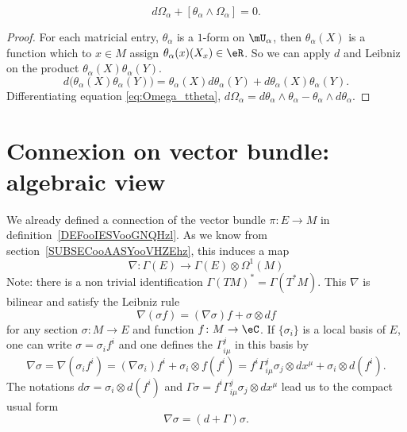 \begin{lemma}
	\[
		d\Omega_{\alpha}+[\theta_{\alpha}\wedge\Omega_{\alpha}]=0.
	\]
\end{lemma}

\begin{proof}
	For each matricial entry, $\theta_{\alpha}$ is a $1$-form on $\mU_{\alpha}$, then $\theta_{\alpha}(X)$ is a function which to $x\in M$ assign $\theta_{\alpha}(x)(X_x)\in\eR$. So we can apply $d$ and Leibniz on the product $\theta_{\alpha}(X)\theta_{\alpha}(Y)$.
	\[
		d\big(  \theta_{\alpha}(X)\theta_{\alpha}(Y)  \big)=\theta_{\alpha}(X)d\theta_{\alpha}(Y)+d\theta_{\alpha}(X)\theta_{\alpha}(Y).
	\]
	Differentiating equation \eqref{eq:Omega_ttheta}, $d\Omega_{\alpha}=d\theta_{\alpha}\wedge\theta_{\alpha}-\theta_{\alpha}\wedge d\theta_{\alpha}$.
\end{proof}

\section{Connexion on vector bundle: algebraic view}

We already defined a connection of the vector bundle \( \pi\colon E\to M\) in definition~\ref{DEFooIESVooGNQHzl}. As we know from section~\ref{SUBSECooAASYooVHZEhz}, this induces a map
\begin{equation}        \label{EQooBRLHooJgzIyT}
	\nabla\colon \Gamma(E)\to \Gamma(E)\otimes \Omega^1(M)
\end{equation}
Note: there is a non trivial identification \( \Gamma(TM)^*=\Gamma(T^*M)\). This \( \nabla\) is bilinear and satisfy the Leibniz rule
\begin{equation}
	\nabla(\sigma f)=(\nabla\sigma)f+\sigma\otimes df
\end{equation}
for any section $\sigma\colon M\to E$ and function $f\colon M\to \eC$. If $\{ \sigma_i \}$ is a local basis of $E$, one can write $\sigma=\sigma_if^i$ and one defines the  $\Gamma_{i\mu}^{j}$ in this basis by
\begin{equation}
	\nabla \sigma=\nabla (\sigma_if^i)
	=(\nabla \sigma_i)f^i+\sigma_i\otimes f(f^i)
	=f^i\Gamma_{i\mu}^{j}\sigma_j\otimes dx^{\mu}+\sigma_i\otimes d(f^i).
\end{equation}
The notations $d\sigma=\sigma_i\otimes d(f^i)$ and $\Gamma\sigma=f^i\Gamma_{i\mu}^{j}\sigma_j\otimes dx^{\mu}$ lead us to the compact usual form
\[
	\nabla\sigma=(d+\Gamma)\sigma.
\]

